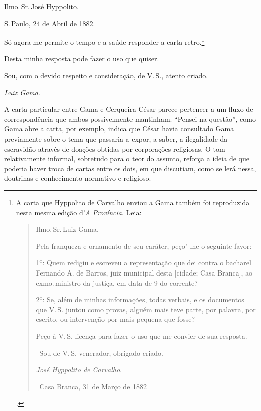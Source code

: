 Ilmo.\,Sr.\,José Hyppolito.

S.\,Paulo, 24 de Abril de 1882.

Só agora me permite o tempo e a saúde responder a carta retro.\footnote{
  A carta que Hyppolito de Carvalho enviou a Gama também foi reproduzida
  nesta mesma edição d'\emph{A} \emph{Província}. Leia:

  \begin{quote}\footnotesize
  Ilmo.\,Sr.\,Luiz Gama.

  Pela franqueza e ornamento de seu caráter, peço"-lhe o seguinte favor:

  1º: Quem redigiu e escreveu a representação que dei contra o bacharel
  Fernando A. de Barros, juiz municipal desta {[}cidade; Casa Branca{]},
  ao exmo.\,ministro da justiça, em data de 9 do corrente?

  2º: Se, além de minhas informações, todas verbais, e os documentos que
  V.\,S. juntou como provas, alguém mais teve parte, por palavra, por
  escrito, ou intervenção por mais pequena que fosse?

  Peço à V.\,S. licença para fazer o uso que me convier de sua resposta.

  \hfill\ Sou de V.\,S. venerador, obrigado criado.

  \hfill\emph{José Hyppolito de Carvalho}.

  \hfill\ Casa Branca, 31 de Março de 1882\end{quote}.}


Desta minha resposta pode fazer o uso que quiser.

Sou, com o devido respeito e consideração, de V.\,S., atento criado.

\hfill\emph{Luiz Gama}.

\pagebreak
\mbox{}\vfill
\thispagestyle{empty}

{\small\noindent
A carta particular entre Gama e Cerqueira César parece pertencer a
um fluxo de correspondência que ambos possivelmente mantinham. ``Pensei
na questão'', como Gama abre a carta, por exemplo, indica que César havia
consultado Gama previamente sobre o tema que passaria a expor, a saber,
a ilegalidade da escravidão através de doações obtidas por corporações
religiosas. O tom relativamente informal, sobretudo para o teor do
assunto, reforça a ideia de que poderia haver troca de cartas entre os
dois, em que discutiam, como se lerá nessa, doutrinas e conhecimento
normativo e religioso. }

